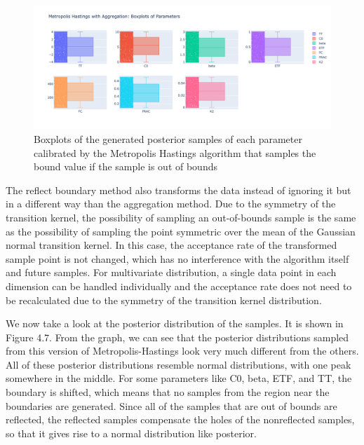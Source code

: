 \begin{figure}[H]
    \centering
    \includegraphics[width=1\textwidth]{figures/basic_mh/aggr_mh/aggr_mh_boxplot.png}
    \captionsetup{width=.8\textwidth}
    \caption{Boxplots of the generated posterior samples of each parameter
calibrated by the Metropolis Hastings algorithm that samples the bound value if the sample is out of bounds}
    \label{fig:enter-label}
\end{figure}



The reflect boundary method also transforms the data instead of ignoring it but in a different way than the aggregation method. Due to the symmetry of the transition kernel, the possibility of sampling an out-of-bounds sample is the same as the possibility of sampling the point symmetric over the mean of the Gaussian normal transition kernel.\cite{gaussian_distribution_property} In this case, the acceptance rate of the transformed sample point is not changed, which has no interference with the algorithm itself and future samples. For multivariate distribution, a single data point in each dimension can be handled individually and the acceptance rate does not need to be recalculated due to the symmetry of the transition kernel distribution. 

We now take a look at the posterior distribution of the samples. It is shown in Figure 4.7. From the graph, we can see that the posterior distributions sampled from this version of Metropolis-Hastings look very much different from the others. All of these posterior distributions resemble normal distributions, with one peak somewhere in the middle. For some parameters like C0, beta, ETF, and TT, the boundary is shifted, which means that no samples from the region near the boundaries are generated. Since all of the samples that are out of bounds are reflected, the reflected samples compensate the holes of the nonreflected samples, so that it gives rise to a normal distribution like posterior.

